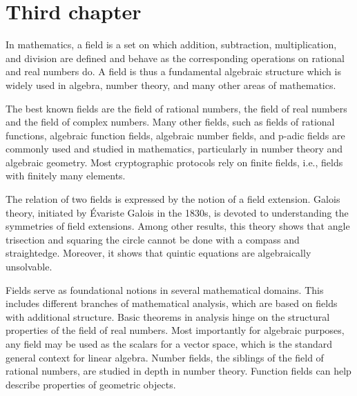 
\chapter{Third chapter}

In mathematics, a field is a set on which addition, subtraction, multiplication, and division are defined and behave as the corresponding operations on rational and real numbers do. A field is thus a fundamental algebraic structure which is widely used in algebra, number theory, and many other areas of mathematics.

The best known fields are the field of rational numbers, the field of real numbers and the field of complex numbers. Many other fields, such as fields of rational functions, algebraic function fields, algebraic number fields, and p-adic fields are commonly used and studied in mathematics, particularly in number theory and algebraic geometry. Most cryptographic protocols rely on finite fields, i.e., fields with finitely many elements.

The relation of two fields is expressed by the notion of a field extension. Galois theory, initiated by Évariste Galois in the 1830s, is devoted to understanding the symmetries of field extensions. Among other results, this theory shows that angle trisection and squaring the circle cannot be done with a compass and straightedge. Moreover, it shows that quintic equations are algebraically unsolvable.

Fields serve as foundational notions in several mathematical domains. This includes different branches of mathematical analysis, which are based on fields with additional structure. Basic theorems in analysis hinge on the structural properties of the field of real numbers. Most importantly for algebraic purposes, any field may be used as the scalars for a vector space, which is the standard general context for linear algebra. Number fields, the siblings of the field of rational numbers, are studied in depth in number theory. Function fields can help describe properties of geometric objects.
